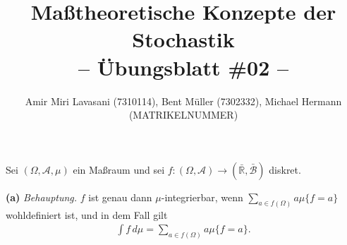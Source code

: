 \documentclass[10pt]{article}
\newcommand{\R}{\mathbb{R}}
\newcommand{\beh}{\textit{Behauptung. }}
\newenvironment{Aufgabe}[2][Aufgabe]{\begin{trivlist}
\item[\hskip \labelsep {\bfseries #1}\hskip \labelsep {\bfseries #2.}]}{\end{trivlist}}
\begin{document}
 
\title{ \textbf{Maßtheoretische Konzepte der Stochastik \\ -- Übungsblatt \#02 --} }

\author{Amir Miri Lavasani (7310114), Bent Müller (7302332),
        Michael Hermann (MATRIKELNUMMER)} \maketitle

 
\begin{Aufgabe}{2}
    Sei $(\Omega,\mathcal{A},\mu)$ ein Maßraum und sei $f: (\Omega,\mathcal{A})\to (\bar{\R}, \bar{\mathcal{B}})$
    diskret. 
\end{Aufgabe}

\textbf{(a)} \beh $f$ ist genau dann $\mu$-integrierbar, wenn $\sum_{a\in f(\Omega)} a\mu\{f=a\}$ 
wohldefiniert ist, und in dem Fall gilt 
  \begin{align*}
    \int f \,d\mu = \sum_{a\in f(\Omega)} a\mu\{f=a\}.
  \end{align*}
\end{document}

